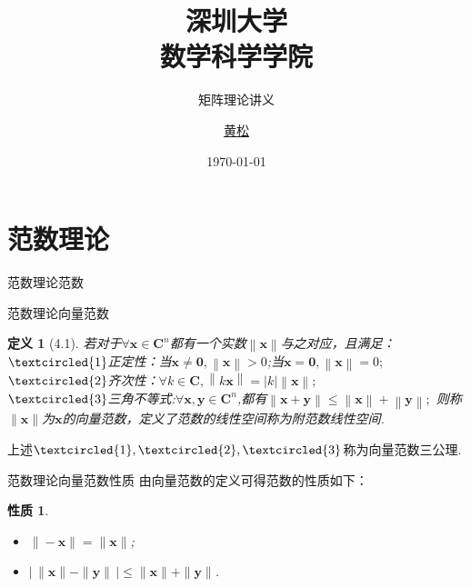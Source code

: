 \documentclass{sintefbeamer}[dark]
\title{深圳大学\\数学科学学院}
\subtitle{矩阵理论讲义}
\author{\href{2300201006@email.szu.edu.cn}{黄松}}
\date{\today}
\newtheorem*{定义}{定义}
\newtheorem*{性质}{性质}
\begin{document}
\maketitle

\section{范数理论}

\begin{frame}{范数理论}{范数}
	
\end{frame}

\begin{frame}{范数理论}{向量范数}
	\begin{定义}[4.1]
		若对于${\forall}\bm{x}\in\mathbf{C}^{n}$都有一个实数$\left \| \bm{x}\right \|$与之对应，且满足：
		\\
		$\textcircled{1}$正定性：当$\bm{x}\neq\bm{0},\left \| \bm{x}\right \|>0$;当$\bm{x}=\bm{0},\left \| \bm{x}\right \|=0;$
		\\
		$\textcircled{2}$齐次性：${\forall}k\in\mathbf{C},\left \| k\bm{x}\right \|=|k|\left \| \bm{x}\right \|;$
		\\
		$\textcircled{3}$三角不等式:${\forall}\bm{x},\bm{y}\in\mathbf{C}^{n}$,都有$\left \| \bm{x}+\bm{y}\right \|\le\left \| \bm{x}\right \|+\left \| \bm{y}\right \|;$
		\linebreak
        则称$\|\bm{x}\|$为$\bm{x}$的向量范数，定义了范数的线性空间称为附范数线性空间.
    \end{定义}
       
        上述$\textcircled{1},\textcircled{2},\textcircled{3}$称为向量范数三公理.
\end{frame}

\begin{frame}{范数理论}{向量范数性质}
	由向量范数的定义可得范数的性质如下：
	\begin{性质}
		\begin{itemize}[<+->]
		\item$\|-\bm{x}\|=\|\bm{x}\|$;
		\item$|\, \|\bm{x}\|-\|\bm{y}\|\,|\le \|\bm{x}\|+\|\bm{y}\|$.
		\end{itemize}
	\end{性质}
\end{frame}
\end{document}
